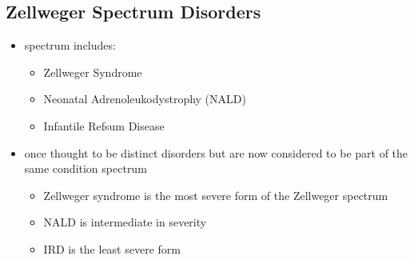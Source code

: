 \documentclass[12pt]{scrartcl}
\begin{document}
\subsection{Zellweger Spectrum Disorders}
\label{sec:org577da57}
\begin{itemize}
\item spectrum includes:
\begin{itemize}
\item Zellweger Syndrome
\item Neonatal Adrenoleukodystrophy (NALD)
\item Infantile Refsum Disease
\end{itemize}
\item once thought to be distinct disorders but are now considered to be
part of the same condition spectrum
\begin{itemize}
\item Zellweger syndrome is the most severe form of the Zellweger spectrum
\item NALD is intermediate in severity
\item IRD is the least severe form
\end{itemize}
\end{itemize}
\end{document}
